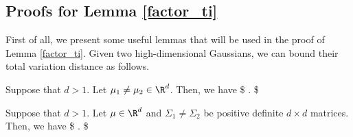 \subsection{Proofs for Lemma \ref{factor_ti}}\label{factor1}
First of all, we present some useful lemmas that will be used in the proof of Lemma \ref{factor_ti}. Given two high-dimensional Gaussians, we can bound their  total variation distance as follows.
\begin{lemma}\label{tv_norm}
Suppose that $d>1$. Let $\mu_1\neq\mu_2\in\R^d$. Then, we have
\$
\leq {}.
\$
\end{lemma}

\begin{lemma}\label{tv_norm_2}
Suppose that $d>1$. Let $\mu\in\R^d$ and $\Sigma_1\neq\Sigma_2$ be positive definite $d\times d$ matrices. Then, we have
\$
\leq {}\leq {}.
\$
\end{lemma}

